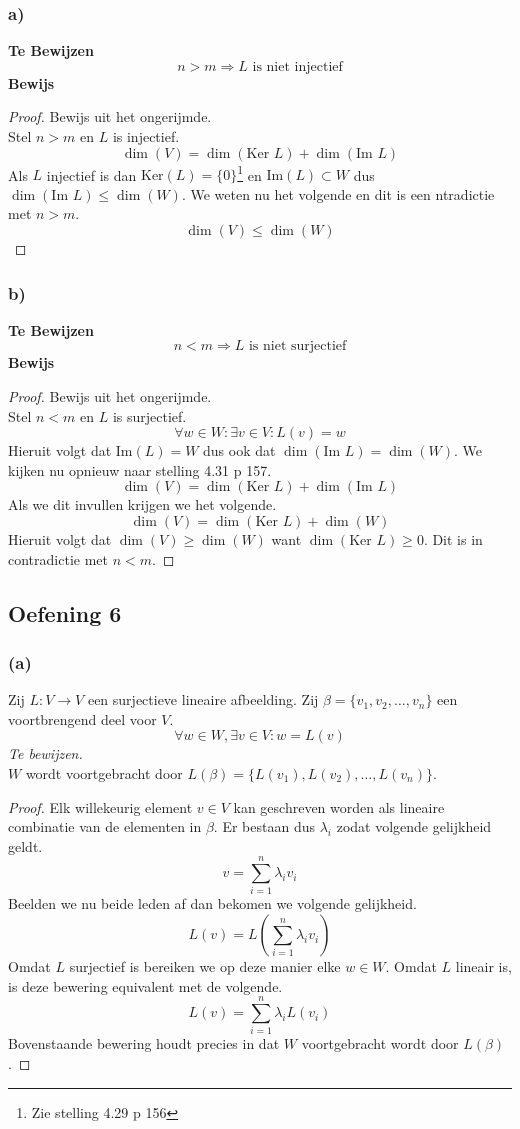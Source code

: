 \documentclass[lineaire_algebra_oplossingen.tex]{subfiles}
\begin{document}
\subsubsection*{a)}
\textbf{Te Bewijzen}
\[
n > m \Rightarrow L \text{ is niet injectief}
\]
\textbf{Bewijs}
\begin{proof}
Bewijs uit het ongerijmde.\\
Stel $n>m$ en $L$ is injectief.
\[
\dim (V) = \dim (\text{Ker }L) + \dim (\text{Im }L)
\]
Als $L$ injectief is dan $\text{Ker}(L)=\{0\}$\footnote{Zie stelling 4.29 p 156} en $\text{Im}(L) \subset W$ dus $\dim (\text{Im }L)\le \dim (W)$. We weten nu het volgende en dit is een ntradictie met $n>m$.
\[
\dim (V) \le \dim (W)
\]
\end{proof}
\subsubsection*{b)}
\textbf{Te Bewijzen}
\[
n < m \Rightarrow L \text{ is niet surjectief}
\]
\textbf{Bewijs}
\begin{proof}
Bewijs uit het ongerijmde.\\
Stel $n<m$ en $L$ is surjectief.
\[
\forall w\in W:\exists v\in V: L(v)=w
\]
Hieruit volgt dat $\text{Im}(L)=W$ dus ook dat $\dim (\text{Im }L)=\dim (W)$.
We kijken nu opnieuw naar stelling 4.31 p 157.
\[
\dim (V) = \dim (\text{Ker }L) + \dim (\text{Im }L)
\]
Als we dit invullen krijgen we het volgende.
\[
\dim (V) = \dim (\text{Ker }L) + \dim (W)
\]
Hieruit volgt dat $\dim (V) \ge \dim (W)$ want $\dim (\text{Ker }L) \ge 0$. Dit is in contradictie met $n<m$.
\end{proof}


\subsection{Oefening 6}
\subsubsection*{(a)}
Zij $L: V \rightarrow V$ een surjectieve lineaire afbeelding. Zij $\beta = \{v_1,v_2,\ldots,v_n\}$ een voortbrengend deel voor $V$.
\[
\forall w \in W, \exists v \in V: w=L(v)
\]
\emph{Te bewijzen.}\\
$W$ wordt voortgebracht door $L(\beta) = \{L(v_1),L(v_2),\ldots,L(v_n)\}$.
\begin{proof}
Elk willekeurig element $v\in V$ kan geschreven worden als lineaire combinatie van de elementen in $\beta$. Er bestaan dus $\lambda_i$ zodat volgende gelijkheid geldt.
\[
v = \sum_{i=1}^n\lambda_iv_i
\]
Beelden we nu beide leden af dan bekomen we volgende gelijkheid.
\[
L(v) = L\left(\sum_{i=1}^n\lambda_iv_i\right)
\]
Omdat $L$ surjectief is bereiken we op deze manier elke $w\in W$.
Omdat $L$ lineair is, is deze bewering equivalent met de volgende.
\[
L(v) = \sum_{i=1}^n\lambda_iL(v_i)
\]
Bovenstaande bewering houdt precies in dat $W$ voortgebracht wordt door $L(\beta)$.
\end{proof}
\end{document}
